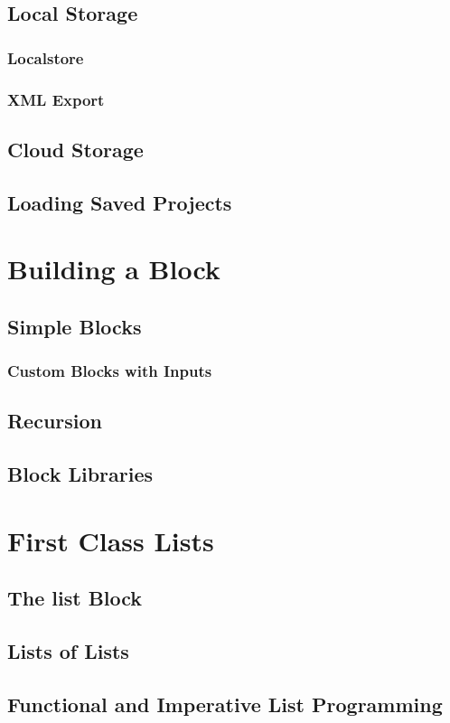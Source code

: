 \documentclass{report}
\begin{document}
\section{Local Storage}
\subsection{Localstore}
\subsection{XML Export}
\section{Cloud Storage}
\section{Loading Saved Projects}
\chapter{Building a Block}
\section{Simple Blocks}
\subsection{Custom Blocks with Inputs}
\section{Recursion}
\section{Block Libraries}
\chapter{First Class Lists}
\section{The list Block}
\section{Lists of Lists}
\section{Functional and Imperative List Programming}
\end{document}
